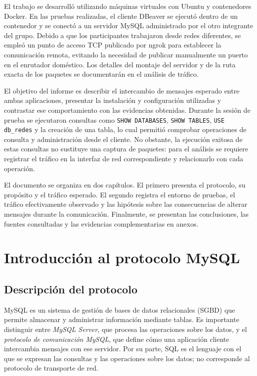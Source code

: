 \documentclass[10pt,a4paper]{article}
\begin{document}
El trabajo se desarrolló utilizando máquinas virtuales con Ubuntu y contenedores Docker. En las pruebas realizadas, el cliente DBeaver se ejecutó dentro de un contenedor y se conectó a un servidor MySQL administrado por el otro integrante del grupo. Debido a que los participantes trabajaron desde redes diferentes, se empleó un punto de acceso TCP publicado por ngrok para establecer la comunicación remota, evitando la necesidad de publicar manualmente un puerto en el enrutador doméstico. Los detalles del montaje del servidor y de la ruta exacta de los paquetes se documentarán en el análisis de tráfico.

El objetivo del informe es describir el intercambio de mensajes esperado entre ambas aplicaciones, presentar la instalación y configuración utilizadas y contrastar ese comportamiento con las evidencias obtenidas. Durante la sesión de prueba se ejecutaron consultas como \texttt{SHOW DATABASES}, \texttt{SHOW TABLES}, \texttt{USE db\_redes} y la creación de una tabla, lo cual permitió comprobar operaciones de consulta y administración desde el cliente. No obstante, la ejecución exitosa de estas consultas no sustituye una captura de paquetes: para el análisis se requiere registrar el tráfico en la interfaz de red correspondiente y relacionarlo con cada operación.

El documento se organiza en dos capítulos. El primero presenta el protocolo, su propósito y el tráfico esperado. El segundo registra el entorno de pruebas, el tráfico efectivamente observado y las hipótesis sobre las consecuencias de alterar mensajes durante la comunicación. Finalmente, se presentan las conclusiones, las fuentes consultadas y las evidencias complementarias en anexos.

\clearpage
\section{Introducción al protocolo MySQL}
\label{cap:teoria}

\subsection{Descripción del protocolo}
\label{sub:descripcion}
MySQL es un sistema de gestión de bases de datos relacionales (SGBD) que permite almacenar y administrar información mediante tablas. Es importante distinguir entre \emph{MySQL Server}, que procesa las operaciones sobre los datos, y el \emph{protocolo de comunicación MySQL}, que define cómo una aplicación cliente intercambia mensajes con ese servidor. Por su parte, SQL es el lenguaje con el que se expresan las consultas y las operaciones sobre los datos; no corresponde al protocolo de transporte de red.
\end{document}
